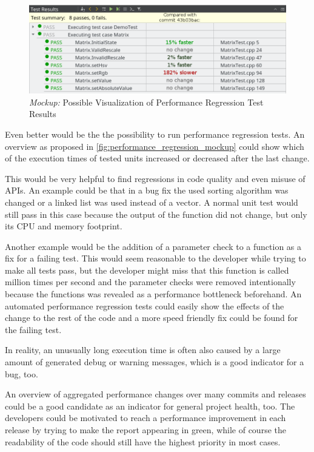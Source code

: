 \documentclass{scrreprt}
\begin{document}
\begin{figure}[h]
	\centering
	\includegraphics[width=1.0\textwidth]{img/performance_regression_mockup}
	\caption[Mockup: Performance Regression]{\textit{Mockup:} Possible Visualization of Performance Regression Test Results}
	\label{fig:performance_regression_mockup}
\end{figure}

Even better would be the the possibility to run performance regression tests. An overview as proposed in \vref{fig:performance_regression_mockup} could show which of the execution times of tested units increased or decreased after the last change.

This would be very helpful to find regressions in code quality and even misuse of APIs. An example could be that in a bug fix the used sorting algorithm was changed or a linked list was used instead of a vector. A normal unit test would still pass in this case because the output of the function did not change, but only its CPU and memory footprint.

Another example would be the addition of a parameter check to a function as a fix for a failing test. This would seem reasonable to the developer while trying to make all tests pass, but the developer might miss that this function is called million times per second and the parameter checks were removed intentionally because the functions was revealed as a performance bottleneck beforehand. An automated performance regression tests could easily show the effects of the change to the rest of the code and a more speed friendly fix could be found for the failing test.

In reality, an unusually long execution time is often also caused by a large amount of generated debug or warning messages, which is a good indicator for a bug, too.

An overview of aggregated performance changes over many commits and releases could be a good candidate as an indicator for general project health, too. The developers could be motivated to reach a performance improvement in each release by trying to make the report appearing in green, while of course the readability of the code should still have the highest priority in most cases.
\end{document}
